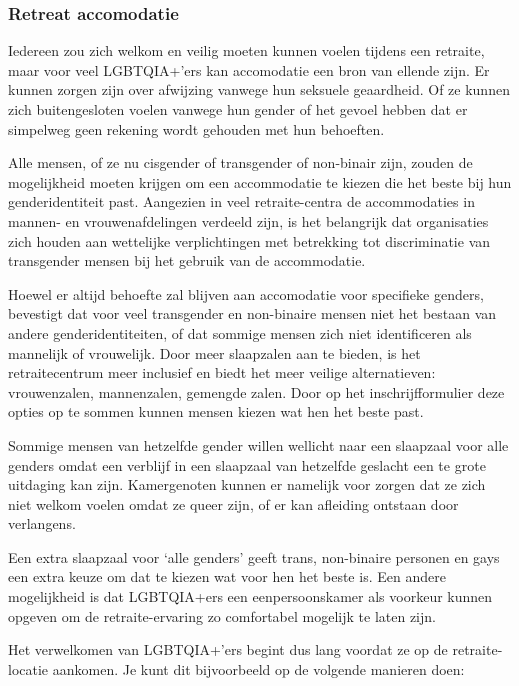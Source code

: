\documentclass[12pt,openany]{book}
\begin{document}
\subsubsection*{Retreat accomodatie}

Iedereen zou zich welkom en veilig moeten kunnen voelen tijdens een retraite, maar voor veel LGBTQIA+'ers kan accomodatie een bron van ellende zijn. Er kunnen zorgen zijn over afwijzing vanwege hun seksuele geaardheid. Of ze kunnen zich buitengesloten voelen vanwege hun gender of het gevoel hebben dat er simpelweg geen rekening wordt gehouden met hun behoeften. 

Alle mensen, of ze nu cisgender of transgender of non-binair zijn, zouden de mogelijkheid moeten krijgen om een accommodatie te kiezen die het beste bij hun genderidentiteit past. Aangezien in veel retraite-centra de accommodaties in mannen- en vrouwenafdelingen verdeeld zijn, is het belangrijk dat organisaties zich houden aan wettelijke verplichtingen met betrekking tot discriminatie van transgender mensen bij het gebruik van de accommodatie.

Hoewel er altijd behoefte zal blijven aan accomodatie voor specifieke genders, bevestigt dat voor veel transgender en non-binaire mensen niet het bestaan van andere genderidentiteiten, of dat sommige mensen zich niet identificeren als mannelijk of vrouwelijk. Door meer slaapzalen aan te bieden, is het retraitecentrum meer inclusief en biedt het meer veilige alternatieven: vrouwenzalen, mannenzalen, gemengde zalen. Door op het inschrijfformulier deze opties op te sommen kunnen mensen kiezen wat hen het beste past.

Sommige mensen van hetzelfde gender willen wellicht naar een slaapzaal voor alle genders omdat een verblijf in een slaapzaal van hetzelfde geslacht een te grote uitdaging kan zijn. Kamergenoten kunnen er namelijk voor zorgen dat ze zich niet welkom voelen omdat ze queer zijn, of er kan afleiding ontstaan door verlangens.

Een extra slaapzaal voor `alle genders' geeft trans, non-binaire personen en gays een extra keuze om dat te kiezen wat voor hen het beste is. Een andere mogelijkheid is dat LGBTQIA+ers een eenpersoonskamer als voorkeur kunnen opgeven om de retraite-ervaring zo comfortabel mogelijk te laten zijn. 

Het verwelkomen van LGBTQIA+'ers begint dus lang voordat ze op de retraite-locatie aankomen. Je kunt dit bijvoorbeeld op de volgende manieren doen:
\end{document}
